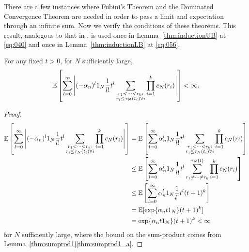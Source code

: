 There are a few instances where Fubini's Theorem and the Dominated Convergence Theorem are needed in order to pass a limit and expectation through an infinite sum.
Now we verify the conditions of these theorems.
This result, analogous to that in \textcite[p.24]{koskela2018}, is used once
in Lemma~\ref{thm:inductionUB} at \eqref{eq:040} and once in Lemma~\ref{thm:inductionLB} at \eqref{eq:056}.
\begin{lemma}\label{thm:DCT_Fubini}
For any fixed $t>0$, for $N$ sufficiently large,
\begin{equation*}
\mathbb{E} \left[ \sum_{l=0}^\infty \Bigg| (-\alpha_n)^l 1_N \frac{1}{l!} t^l 
        \sum_{\substack{r_1 < \cdots < r_k : \\ r_i \leq \tau_N(t_i) \forall i}}
        \prod_{i=1}^k c_N(r_i) \Bigg| \right]
< \infty .
\end{equation*}
\end{lemma}

\begin{proof}
\begin{align*}
\mathbb{E} \left[ \sum_{l=0}^\infty \Bigg| (-\alpha_n)^l 1_N \frac{1}{l!} t^l 
        \sum_{\substack{r_1 < \cdots < r_k : \\ r_i \leq \tau_N(t_i) \forall i}}
        \prod_{i=1}^k c_N(r_i) \Bigg| \right]
&= \mathbb{E} \left[ \sum_{l=0}^\infty \alpha_n^l 1_N \frac{1}{l!} t^l 
        \sum_{\substack{r_1 < \cdots < r_k : \\ r_i \leq \tau_N(t_i) \forall i}}
        \prod_{i=1}^k c_N(r_i) \right] \\
&\leq \mathbb{E} \left[ \sum_{l=0}^\infty \alpha_n^l 1_N \frac{1}{l!} t^l 
        \sum_{r_1 \neq \cdots \neq r_k}^{\tau_N(t)}
        \prod_{i=1}^k c_N(r_i) \right] \\        
&\leq \mathbb{E} \left[ \sum_{l=0}^\infty \alpha_n^l 1_N \frac{1}{l!} t^l 
        (t+1)^k \right] \\
&= \mathbb{E}[ \exp\{ \alpha_n t 1_N \} (t+1)^k ]\\
&= \exp\{ \alpha_n t 1_N \} (t+1)^k
< \infty 
\end{align*}
for $N$ sufficiently large,
where the bound on the sum-product comes from Lemma~\ref{thm:sumprod1}\ref{thm:sumprod1_a}.
\end{proof}



